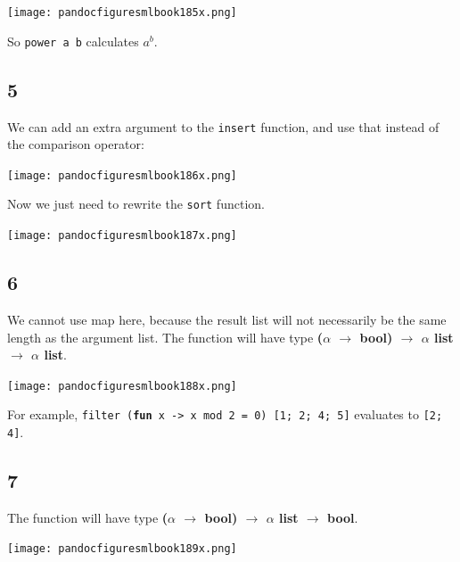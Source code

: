 \documentclass[]{book}
\begin{document}
\medskip
\begin{center}
\noindent\texttt{[image: pandocfiguresmlbook185x.png]}
\end{center}
\medskip

\noindent So \texttt{power a b} calculates $a^{b}$.

\subsection*{5}
We can add an extra argument to the \texttt{insert} function, and use that instead of the comparison operator:

\medskip
\begin{center}
\noindent\texttt{[image: pandocfiguresmlbook186x.png]}
\end{center}
\medskip

\noindent Now we just need to rewrite the \texttt{sort} function.

\medskip
\begin{center}
\noindent\texttt{[image: pandocfiguresmlbook187x.png]}
\end{center}
\medskip

\subsection*{6}
We cannot use map here, because the result list will not necessarily be the same length as the argument list. The function will have type \textbf{\textsf{\textmd{(}$\alpha$ $\rightarrow$ bool\textmd{)} $\rightarrow$ $\alpha$ list $\rightarrow$ $\alpha$ list}}. 

\medskip
\begin{center}
\noindent\texttt{[image: pandocfiguresmlbook188x.png]}
\end{center}
\medskip

\noindent For example, \texttt{filter (}\textbf{\texttt{fun}}\texttt{ x -> x mod 2 = 0) [1; 2; 4; 5]} evaluates to \texttt{[2; 4]}.

\subsection*{7}
The function will have type \textbf{\textsf{\textmd{(}$\alpha$ $\rightarrow$ bool\textmd{)} $\rightarrow$ $\alpha$ list $\rightarrow$ bool}}.

\medskip
\begin{center}
\noindent\texttt{[image: pandocfiguresmlbook189x.png]}
\end{center}
\medskip
\end{document}
